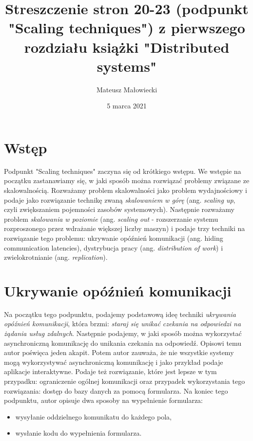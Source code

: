\documentclass[10pt, a4paper]{article}
\author{Mateusz Małowiecki}
\title{Streszczenie stron 20-23 (podpunkt "Scaling techniques") z pierwszego rozdziału książki "Distributed systems"}
\date{5 marca 2021}
\begin{document}
\maketitle
\section*{Wstęp}
Podpunkt "Scaling techniques" zaczyna się od krótkiego wstępu. We wstępie na początku zastanawiamy się, w jaki sposób można rozwiązać problemy związane ze skalowalnością. Rozważamy problem skalowalności jako problem wydajnościowy i podaje jako rozwiązanie technikę zwaną \textit{skalowaniem w górę} (ang. \textit{scaling up}, czyli zwiększaniem pojemności zasobów systemowych). Następnie rozważamy problem \textit{skalowania w poziomie} (ang. \textit{scaling out} - rozszerzanie systemu rozproszonego przez wdrażanie większej liczby maszyn) i podaje trzy techniki na rozwiązanie tego problemu: ukrywanie opóźnień komunikacji (ang. hiding communication latencies), dystrybucja pracy (ang. \textit{distribution of work}) i zwielokrotnianie (ang. \textit{replication}).
\section*{Ukrywanie opóźnień komunikacji}
Na początku tego podpunktu, podajemy podstawową ideę techniki \textit{ukrywania opóźnień komunikacji}, która brzmi: \textit{staraj się unikać czekania na odpowiedzi na żądania usług zdalnych}. Następnie podajemy, w jaki sposób można wykorzystać asynchroniczną komunikację do unikania czekania na odpowiedź. Opisowi temu autor poświęca jeden akapit. Potem autor zauważa, że nie wszystkie systemy mogą wykorzystywać asynchroniczną komunikację i jako przykład podaje aplikacje interaktywne. Podaje też rozwiązanie, które jest lepsze w tym przypadku: ograniczenie ogólnej komunikacji oraz przypadek wykorzystania tego rozwiązania: dostęp do bazy danych za pomocą formularza. Na koniec tego podpunktu, autor opisuje dwa sposoby na wypełnienie formularza: 
\begin{itemize}
\item wysyłanie oddzielnego komunikatu do każdego pola, 
\item wysłanie kodu do wypełnienia formularza.
\end{itemize}
\end{document}
